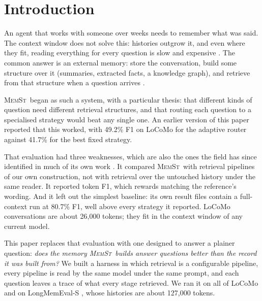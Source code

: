 \documentclass[11pt,letterpaper]{article}
\newcommand{\memst}{\textsc{MemSt}}
\begin{document}
\begin{abstract}
We conclude that, on these benchmarks, a memory system's value does not lie in a structured index that answers questions better than the raw record does. We argue that it lies in what the record supports: versioning, provenance, correction and deletion, and control over what an agent may write into its own future context.

\vspace{2mm}
\noindent\textbf{Code and results}: \href{https://github.com/yfyang86/memst}{https://github.com/yfyang86/memst}
\end{abstract}

\section{Introduction}
\label{sec:intro}

An agent that works with someone over weeks needs to remember what was said. The context window does not solve this: histories outgrow it, and even where they fit, reading everything for every question is slow and expensive \citep{bulatov2022recurrent}. The common answer is an external memory: store the conversation, build some structure over it (summaries, extracted facts, a knowledge graph), and retrieve from that structure when a question arrives \citep{packer2023memgpt, zhong2024memorybank, chhikara2025mem0, rasmussen2025zep, xu2025mem}.

\memst\ began as such a system, with a particular thesis: that different kinds of question need different retrieval structures, and that routing each question to a specialised strategy would beat any single one. An earlier version of this paper reported that this worked, with 49.2\% F1 on LoCoMo for the adaptive router against 41.7\% for the best fixed strategy.

That evaluation had three weaknesses, which are also the ones the field has since identified in much of its own work \citep{bao2026naiverag, zhou2026explicit}. It compared \memst\ with retrieval pipelines of our own construction, not with retrieval over the untouched history under the same reader. It reported token F1, which rewards matching the reference's wording. And it left out the simplest baseline: its own result files contain a full-context run at 80.7\% F1, well above every strategy it reported. LoCoMo conversations are about 26,000 tokens; they fit in the context window of any current model.

This paper replaces that evaluation with one designed to answer a plainer question: \emph{does the memory \memst\ builds answer questions better than the record it was built from?} We built a harness in which retrieval is a configurable pipeline, every pipeline is read by the same model under the same prompt, and each question leaves a trace of what every stage retrieved. We ran it on all of LoCoMo \citep{maharana2024evaluating} and on LongMemEval-S \citep{wu2024longmemeval}, whose histories are about 127,000 tokens.
\end{document}
